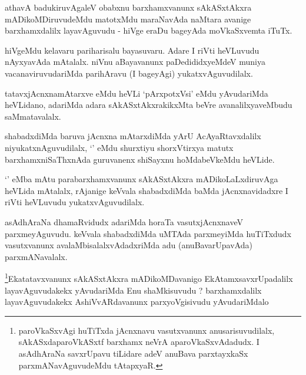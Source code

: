 
\begin{artha}
athavA badukiruvAgaleV obabxnu barxhamxvanunx sAkASxtAkxra mADikoMDiruvudeMdu matotxMdu maraNavAda naMtara avanige barxhamxdalilx layavAguvudu - hiVge eraDu bageyAda moVkaSxvemta iTuTx.
\end{artha}

\begin{artha}
hiVgeMdu kelavaru pariharisalu bayasuvaru. Adare I riVti heVLuvudu nAyxyavAda mAtalalx. niVnu aBayavanunx paDedididxyeMdeV muniya vacanaviruvudariMda parihAravu (I bageyAgi) yukatxvAguvudilalx.
\end{artha}


\begin{artha}
tatavxjAcnxnamAtarxve eMdu heVLi `pArxpotxVsi' eMdu yAvudariMda heVLidano, adariMda adara sAkASxtAkxrakikxMta beVre avanalilxyaveMbudu saMmatavalalx.
\end{artha}

\begin{artha}
shabadxdiMda baruva jAcnxna mAtarxdiMda yArU AcAyaRtavxdalilx niyukatxnAguvudilalx, `\stext' eMdu shurxtiyu shorxVtirxya matutx barxhamxniSaThxnAda guruvanenx shiSayxnu hoMdabeVkeMdu heVLide.
\end{artha}

\begin{artha}
`\stext' eMba mAtu parabarxhamxvanunx sAkASxtAkxra mADikoLaLxdiruvAga heVLida mAtalalx, rAjanige keVvala shabadxdiMda baMda jAcnxnavidadxre I riVti heVLuvudu yukatxvAguvudilalx.
\end{artha}

\begin{artha}
asAdhAraNa dhamaRvidudx adariMda horaTa vasutxjAcnxnaveV parxmeyAguvudu. keVvala shabadxdiMda uMTAda parxmeyiMda huTiTxdudx vasutxvanunx avalaMbisalalxvAdadxriMda adu (anuBavarUpavAda) parxmANavalalx.
\end{artha}

\begin{artha}
\footnote{paroVkaSxvAgi huTiTxda jAcnxnavu vasutxvanunx anusarisuvudilalx, sAkASxdaparoVkASxtf barxhamx neVrA aparoVkaSxvAdadudx. I asAdhAraNa savxrUpavu tiLidare adeV anuBava parxtayxkaSx parxmANavAguvudeMdu tAtapxyaR.}Ekatatavxvanunx sAkASxtAkxra mADikoMDavanigo EkAtamxsavxrUpadalilx layavAguvudakekx yAvudariMda Enu shaMkisuvudu ? barxhamxdalilx layavAguvudakekx AshiVvARdavanunx parxyoVgisivudu yAvudariMdalo
\end{artha}

